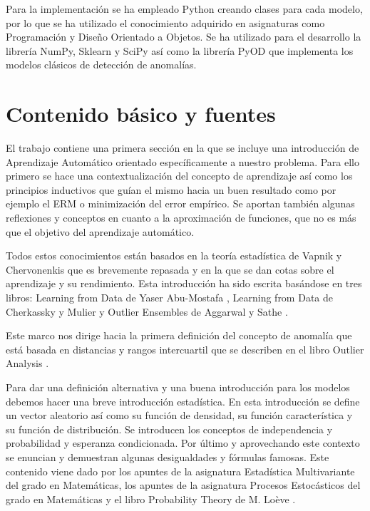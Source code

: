 Para la implementación se ha empleado Python creando clases para cada modelo, por lo que se ha utilizado el conocimiento adquirido en asignaturas como Programación y Diseño Orientado a Objetos. Se ha utilizado para el desarrollo la librería NumPy, Sklearn y SciPy así como la librería PyOD que implementa los modelos clásicos de detección de anomalías. 

\section{Contenido básico y fuentes}

El trabajo contiene una primera sección en la que se incluye una introducción de Aprendizaje Automático orientado específicamente a nuestro problema. Para ello primero se hace una contextualización del concepto de aprendizaje así como los principios inductivos que guían el mismo hacia un buen resultado como por ejemplo el ERM o minimización del error empírico. Se aportan también algunas reflexiones y conceptos en cuanto a la aproximación de funciones, que no es más que el objetivo del aprendizaje automático. 

Todos estos conocimientos están basados en la teoría estadística de Vapnik y Chervonenkis que es brevemente repasada y en la que se dan cotas sobre el aprendizaje y su rendimiento. Esta introducción ha sido escrita basándose en tres libros: Learning from Data de Yaser Abu-Mostafa \cite{yaser_learning_2012}, Learning from Data de Cherkassky y Mulier \cite{cherkassky_learning_2007}  y Outlier Ensembles de Aggarwal y Sathe \cite{aggarwal_outlier_2017}.

Este marco nos dirige hacia la primera definición del concepto de anomalía que está basada en distancias y rangos intercuartil que se describen en el libro Outlier Analysis \cite{aggarwal_outlier_2017-1}.

Para dar una definición alternativa y una buena introducción para los modelos debemos hacer una breve introducción estadística. En esta introducción se define un vector aleatorio así como su función de densidad, su función característica y su función de distribución. Se introducen los conceptos de independencia y probabilidad y esperanza condicionada. Por último y aprovechando este contexto se enuncian y demuestran algunas desigualdades y fórmulas famosas. Este contenido viene dado por los apuntes de la asignatura Estadística Multivariante del grado en Matemáticas, los apuntes de la asignatura Procesos Estocásticos del grado en Matemáticas y el libro Probability Theory de M. Loève \cite{m._loeve_probability_1977}.

